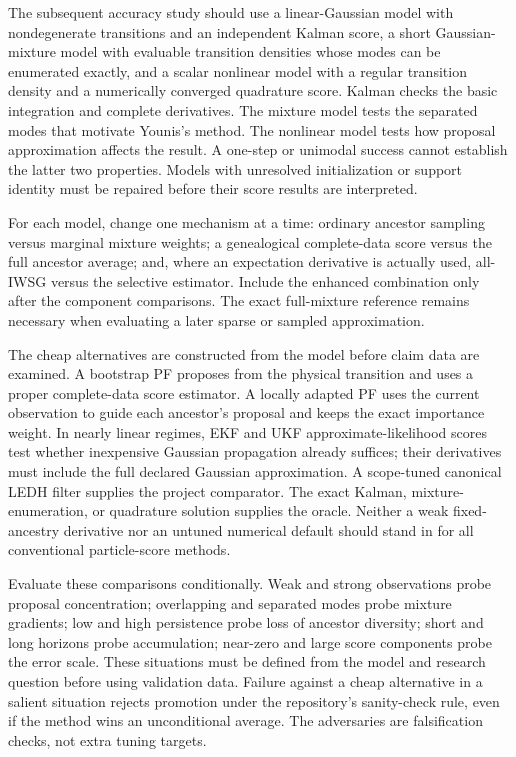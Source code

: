\documentclass[11pt]{article}
\begin{document}
The subsequent accuracy study should use a linear-Gaussian model with
nondegenerate transitions and an independent Kalman score, a short
Gaussian-mixture model with evaluable transition densities whose modes can be
enumerated exactly, and a scalar nonlinear model with a regular transition
density and a numerically converged quadrature score. Kalman checks the basic
integration and complete derivatives.
The mixture model tests the separated modes that motivate Younis's method.
The nonlinear model tests how proposal approximation affects the result.
A one-step or unimodal success cannot establish the latter two properties.
Models with unresolved initialization or support identity must be repaired
before their score results are interpreted.

For each model, change one mechanism at a time: ordinary ancestor sampling
versus marginal mixture weights; a genealogical complete-data score versus
the full ancestor average; and, where an expectation derivative is actually
used, all-IWSG versus the selective estimator. Include the enhanced
combination only after the component comparisons. The exact full-mixture
reference remains necessary when evaluating a later sparse or sampled
approximation.

The cheap alternatives are constructed from the model before claim data are
examined. A bootstrap PF proposes from the physical transition and uses a
proper complete-data score estimator. A locally adapted PF uses the current
observation to guide each ancestor's proposal and keeps the exact importance
weight. In nearly linear regimes, EKF and UKF approximate-likelihood scores
test whether inexpensive Gaussian propagation already suffices; their
derivatives must include the full declared Gaussian approximation. A
scope-tuned canonical LEDH filter supplies the project comparator. The exact
Kalman, mixture-enumeration, or quadrature solution supplies the oracle.
Neither a weak fixed-ancestry derivative nor an untuned numerical default
should stand in for all conventional particle-score methods.

Evaluate these comparisons conditionally. Weak and strong observations probe
proposal concentration; overlapping and separated modes probe mixture
gradients; low and high persistence probe loss of ancestor diversity; short
and long horizons probe accumulation; near-zero and large score components
probe the error scale. These situations must be defined from the model and
research question before using validation data. Failure against a cheap
alternative in a salient situation rejects promotion under the repository's
sanity-check rule, even if the method wins an unconditional average. The
adversaries are falsification checks, not extra tuning targets.
\end{document}
